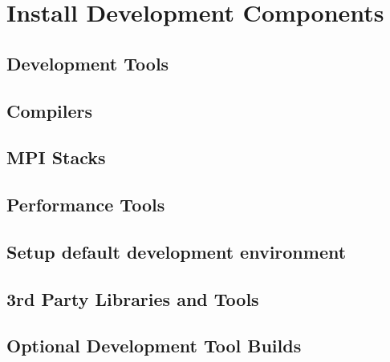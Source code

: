 \documentclass{ohpc-doc}
\begin{document}

\chapter{Install \OHPC{} Development Components}


\section{Development Tools} \label{sec:install_dev_tools}


\section{Compilers} \label{sec:install_compilers}


\section{MPI Stacks} \label{sec:mpi}


\section{Performance Tools} \label{sec:install_perf_tools}


\section{Setup default development environment}


\section{3rd Party Libraries and Tools} \label{sec:3rdparty}





\section{Optional Development Tool Builds} \label{sec:3rdparty_intel}

\end{document}
